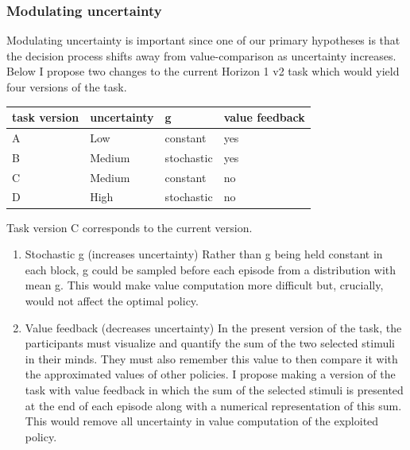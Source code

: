 \documentclass[11pt]{article}
\begin{document}
\subsubsection{Modulating uncertainty}
\label{sec:org631adc7}
Modulating uncertainty is important since one of our primary hypotheses is that the decision process shifts away from value-comparison as uncertainty increases. Below I propose two changes to the current Horizon 1 v2 task which would yield four versions of the task.
\begin{table}[htbp]
\label{Table 3}
\centering
\begin{tabular}{llll}
task version & uncertainty & g & value feedback\\
\hline
A & Low & constant & yes\\
B & Medium & stochastic & yes\\
C & Medium & constant & no\\
D & High & stochastic & no\\
\end{tabular}
\end{table}
Task version C corresponds to the current version.
\begin{enumerate}
\item Stochastic g (increases uncertainty)
\label{sec:org57d0673}
Rather than g being held constant in each block, g could be sampled before each episode from a distribution with mean g. This would make value computation more difficult but, crucially, would not affect the optimal policy.
\item Value feedback (decreases uncertainty)
\label{sec:org1a95e7f}
In the present version of the task, the participants must visualize and quantify the sum of the two selected stimuli in their minds. They must also remember this value to then compare it with the approximated values of other policies. I propose making a version of the task with value feedback in which the sum of the selected stimuli is presented at the end of each episode along with a numerical representation of this sum. This would remove all uncertainty in value computation of the exploited policy.
\end{enumerate}
\end{document}

